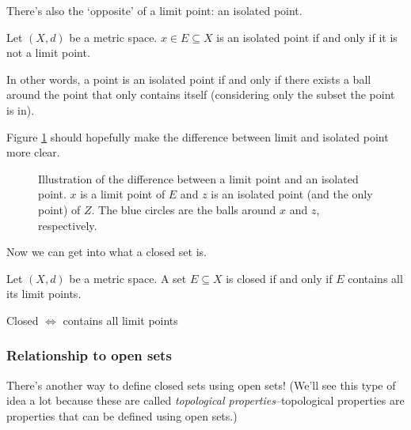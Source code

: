 \documentclass[class=article, crop=false]{standalone}
\begin{document}
There's also the `opposite' of a limit point: an isolated point.
\begin{defn}
    Let $(X,d)$ be a metric space. $x \in E \subseteq X$ is an isolated point if and only if it is not a limit point.
\end{defn}
\begin{rem}
    In other words, a point is an isolated point if and only if there exists a ball around the point that only contains itself (considering only the subset the point is in).
\end{rem}

Figure \ref{fig:limitvsisolated} should hopefully make the difference between limit and isolated point more clear.
\begin{figure}[ht]
    \centering
    \caption{Illustration of the difference between a limit point and an isolated point. $x$ is a limit point of $E$ and $z$ is an isolated point (and the only point) of $Z$. The blue circles are the balls around $x$ and $z$, respectively.}
    \label{fig:limitvsisolated}
\end{figure}

Now we can get into what a closed set is.

\begin{defn}
    Let $(X,d)$ be a metric space. A set $E \subseteq X$ is closed if and only if $E$ contains all its limit points.
\end{defn}
\begin{slogan}
    Closed $\iff$ contains all limit points
\end{slogan}



\subsubsection*{Relationship to open sets}

There's another way to define closed sets using open sets! (We'll see this type of idea a lot because these are called \textit{topological properties}--topological properties are properties that can be defined using open sets.)
\end{document}
